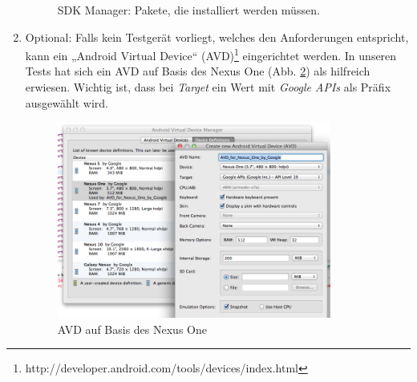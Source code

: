 \begin{enumerate}
\begin{figure}[H]
		\caption{SDK Manager: Pakete, die installiert werden müssen.}
		\label{fg:android-sdk-manager}
	\end{figure}
	\item Optional: Falls kein Testgerät vorliegt, welches den Anforderungen entspricht, kann ein „Android Virtual Device“ (AVD)\footnote{http://developer.android.com/tools/devices/index.html} eingerichtet werden. In unseren Tests hat sich ein AVD auf Basis des Nexus One (Abb. \ref{fg:android-adv}) als hilfreich erwiesen. Wichtig ist, dass bei \textit{Target} ein Wert mit \textit{Google APIs} als Präfix ausgewählt wird.
	\begin{figure}[H]
		\centering
		\includegraphics[width=0.85\textwidth]{./images/install/android-avd.png}
		\caption{AVD auf Basis des Nexus One}
		\label{fg:android-adv}
	\end{figure}
\end{enumerate}
